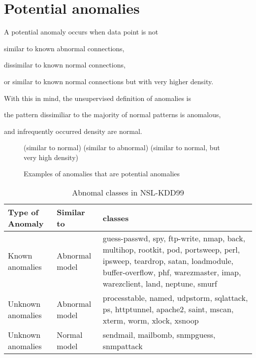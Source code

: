 \section{Potential anomalies}
A potential anomaly occurs when data point is not \begin{inparaenum}
\item similar to known abnormal connections,
\item dissimilar to known normal connections,
\item or similar to known normal connections but with very higher density.
\end{inparaenum}

With this in mind, the unsupervised definition of anomalies is \begin{inparaenum}
\item the pattern dissimiliar to the majority of normal patterns is anomalous, 
\item and infrequently occurred density are normal.
\end{inparaenum}

\begin{figure}[htb2]
\begin{center}
(similar to normal)
(similar to abnormal)
(similar to normal, but very high density)
\end{center}
\caption{Examples of anomalies that are potential anomalies}
\label{fig:refSingleRobot1}
\end{figure}

\begin{table}[h]
\begin{center}
\begin{tabular}{| l | l | p{5cm} |}
\hline
Type of Anomaly & Similar to & classes \\
\hline
Known anomalies & Abnormal model & guess-passwd, spy, ftp-write, nmap, back, multihop, rootkit, pod, portsweep, perl, ipsweep, teardrop, satan, loadmodule, buffer-overflow, phf, warezmaster, imap, warezclient, land, neptune, smurf \\
\hline
Unknown anomalies & Abnormal model & processtable, named, udpstorm, sqlattack, ps, httptunnel, apache2, saint, mscan, xterm, worm, xlock, xsnoop \\
\hline
Unknown anomalies & Normal model & sendmail, mailbomb, snmpguess, snmpattack \\
\hline
\end{tabular}
\end{center}
\caption{Abnomal classes in NSL-KDD99}
\label{fig:refSingleRobot1}
\end{table}
